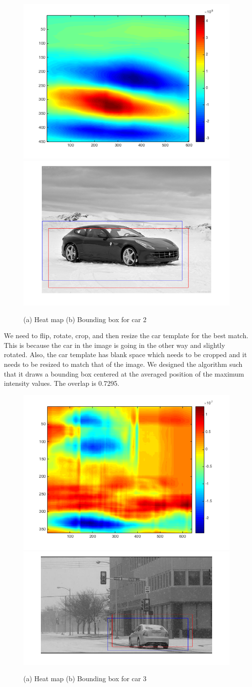 \documentclass{assignment}
\begin{document}
\begin{problemlist}
\begin{enumerate}[label*=\arabic*.]
\begin{figure}[H]
\centering
\includegraphics[width=0.4\columnwidth]{4_3_2_1}
\includegraphics[width=0.4\columnwidth]{4_3_2_2} \\
\caption{(a) Heat map (b) Bounding box for car 2}
\label{fig:i4_3_2}
\end{figure}

We need to flip, rotate, crop, and then resize the car template for the best match. This is because the car in the image is going in the other way and slightly rotated. Also, the car template has blank space which needs to be cropped and it needs to be resized to match that of the image. We designed the algorithm such that it draws a bounding box centered at the averaged position of the maximum intensity values. The overlap is 0.7295.\\

\begin{figure}[H]
\centering
\includegraphics[width=0.4\columnwidth]{4_3_3_1}
\includegraphics[width=0.4\columnwidth]{4_3_3_2} \\
\caption{(a) Heat map (b) Bounding box for car 3}
\label{fig:i4_3_3}
\end{figure}


\end{enumerate}
\end{problemlist}
\end{document}
